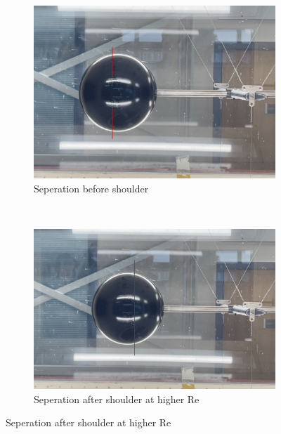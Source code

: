\documentclass[8pt]{article}
\begin{document}
\begin{figure}[H]
    \centering
    \begin{subfigure}[t]{0.48\textwidth}
        \centering
        \includegraphics[width=1\textwidth]{Images_Videos/early_seperation_annotated.jpg}
        \caption{Seperation before shoulder}
        \label{fig:figure2}
    \end{subfigure}
    ~
    \begin{subfigure}[t]{0.48\textwidth}
        \centering
        \includegraphics[width=1\textwidth]{Images_Videos/late_seperation_annotated.jpg}
        \caption{Seperation after shoulder at higher Re}
        \label{fig:figure3}
    \end{subfigure}
\end{figure}
\end{document}
